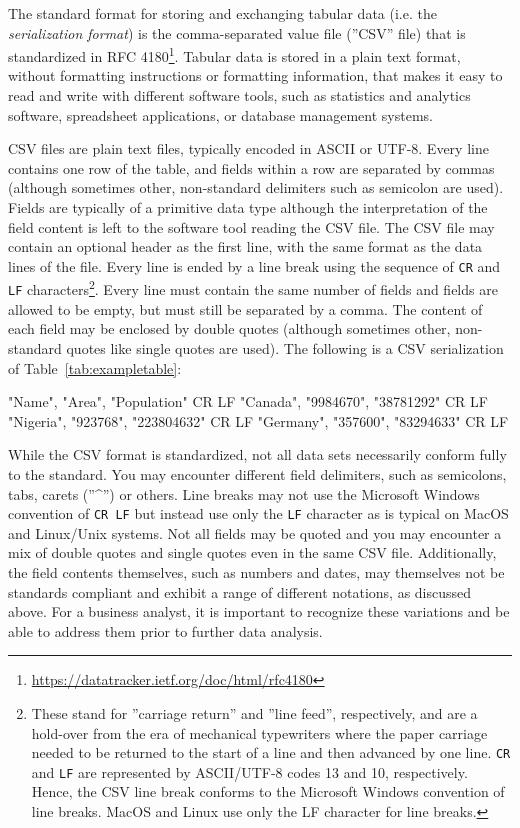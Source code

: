 The standard format for storing and exchanging tabular data (i.e. the \emph{serialization format}) is the comma-separated value file (''CSV'' file)  that is standardized in RFC 4180\footnote{\url{https://datatracker.ietf.org/doc/html/rfc4180}}. Tabular data is stored in a plain text format, without formatting instructions or formatting information, that makes it easy to read and write with different software tools, such as statistics and analytics software, spreadsheet applications, or database management systems. 

CSV files are plain text files, typically encoded in ASCII or UTF-8. Every line contains one row of the table, and fields within a row are separated by commas (although sometimes other, non-standard delimiters such as semicolon are used). Fields are typically of a primitive data type although the interpretation of the field content is left to the software tool reading the CSV file. The CSV file may contain an optional header as the first line, with the same format as the data lines of the file. Every line is ended by a line break using the sequence of  \texttt{CR} and \texttt{LF} characters\footnote{These stand for ''carriage return'' and ''line feed'', respectively, and are a hold-over from the era of mechanical typewriters where the paper carriage needed to be returned to the start of a line and then advanced by one line. \texttt{CR} and \texttt{LF} are represented by ASCII/UTF-8 codes 13 and 10, respectively. Hence, the CSV line break conforms to the Microsoft Windows convention of line breaks. MacOS and Linux use only the LF character for line breaks.}. Every line must contain the same number of fields and fields are allowed to be empty, but must still be separated by a comma. The content of each field may be enclosed by double quotes (although sometimes other, non-standard quotes like single quotes are used). The following is a CSV serialization of Table~\ref{tab:exampletable}:

\begin{textcode}
"Name", "Area", "Population" CR LF
"Canada", "9984670", "38781292" CR LF
"Nigeria", "923768", "223804632" CR LF
"Germany", "357600", "83294633" CR LF
\end{textcode}

While the CSV format is standardized, not all data sets necessarily conform fully to the standard. You may encounter different field delimiters, such as semicolons, tabs, carets (''\^{}'') or others. Line breaks may not use the Microsoft Windows convention of \texttt{CR LF} but instead use only the \texttt{LF} character as is typical on MacOS and Linux/Unix systems. Not all fields may be quoted and you may encounter a mix of double quotes and single quotes even in the same CSV file. Additionally, the field contents themselves, such as numbers and dates, may themselves not be standards compliant and exhibit a range of different notations, as discussed above. For a business analyst, it is important to recognize these variations and be able to address them prior to further data analysis.

